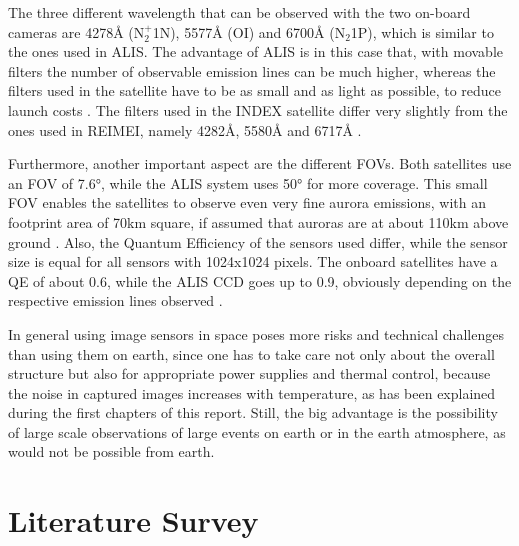 The three different wavelength that can be observed with the two on-board cameras are 4278Å (N$_2^+$1N), 5577Å (OI) and 6700Å (N$_2$1P), which is similar to the ones used in ALIS. The advantage of ALIS is in this case that, with movable filters the number of observable emission lines can be much higher, whereas the filters used in the satellite have to be as small and as light as possible, to reduce launch costs \citep{obuchi2008initial}.
The filters used in the INDEX satellite differ very slightly from the ones used in REIMEI, namely 4282Å, 5580Å and 6717Å \citep{sakanoi2003development}.

Furthermore, another important aspect are the different FOVs. Both satellites use an FOV of 7.6°, while the ALIS system uses 50° for more coverage. This small FOV enables the satellites to observe even very fine aurora emissions, with an footprint area of 70km square, if assumed that auroras are at about 110km above ground \citep{obuchi2008initial}.
Also, the Quantum Efficiency of the sensors used differ, while the sensor size is equal for all sensors with 1024x1024 pixels. The onboard satellites have a QE of about 0.6, while the ALIS CCD goes up to 0.9, obviously depending on the respective emission lines observed \citep{obuchi2008initial,brandstrom2003auroral}.

In general using image sensors in space poses more risks and technical challenges than using them on earth, since one has to take care not only about the overall structure but also for appropriate power supplies and thermal control, because the noise in captured images increases with temperature, as has been explained during the first chapters of this report. Still, the big advantage is the possibility of large scale observations of large events on earth or in the earth atmosphere, as would not be possible from earth.

\section{Literature Survey}




